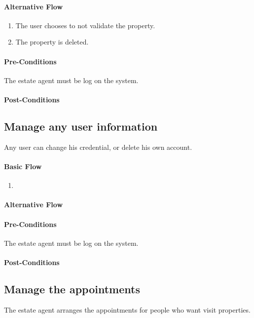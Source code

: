 \documentclass[a4paper,12pt]{article}
\begin{document}
\paragraph{Alternative Flow}
\begin{enumerate}
\item The user chooses to not validate the property.
\item The property is deleted.
\end{enumerate}
\paragraph{Pre-Conditions}
The estate agent must be log on the system.
\paragraph{Post-Conditions}


\subsection{Manage any user information}

Any user can change his credential, or delete his own account.

\paragraph{Basic Flow}
\begin{enumerate}
\item
\end{enumerate}
\paragraph{Alternative Flow}
\paragraph{Pre-Conditions}
The estate agent must be log on the system.
\paragraph{Post-Conditions}

\subsection{Manage the appointments}

The estate agent arranges the appointments for people who want visit properties.
\end{document}
